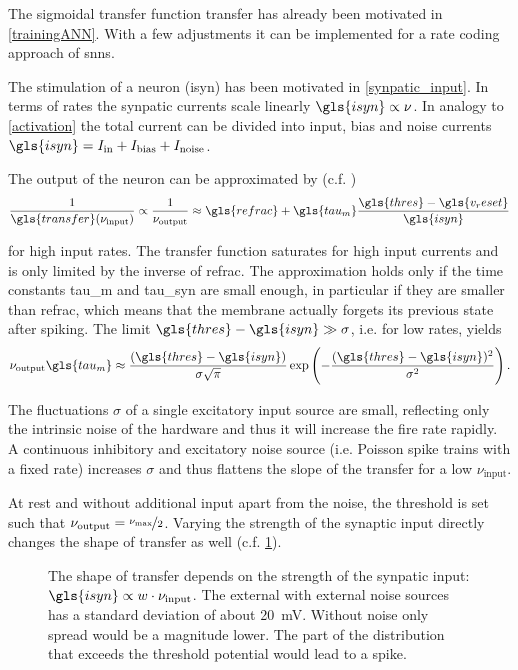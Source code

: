 The sigmoidal transfer function \gls{transfer} has already been motivated in \cref{trainingANN}. With a few adjustments it can be implemented for a rate coding approach of \glspl{snn}.

The stimulation of a neuron (\gls{isyn}) has been motivated in \cref{synpatic_input}. In terms of rates the synpatic currents scale linearly $\gls{isyn} \propto \nu$. In analogy to \cref{activation} the total current can be divided into input, bias and noise currents $\gls{isyn} = I_\text{in} + I_\text{bias} + I_\text{noise}$.

The output of the neuron can be approximated by (c.f. \cite{brunel2000dynamics})
\begin{equation}\label{fireratehigh}
\frac{1}{\gls{transfer}(\nu_\text{input})} \propto \frac{1}{\nu_\text{output}} \approx \gls{refrac} + \gls{tau_m} \frac{\gls{thres} - \gls{v_reset}}{\gls{isyn}}
\end{equation}

for high input rates. The transfer function saturates for high input currents and is only limited by the inverse of \gls{refrac}. The approximation holds only if the time constants \gls{tau_m} and \gls{tau_syn} are small enough, in particular if they are smaller than \gls{refrac}, which means that the membrane actually forgets its previous state after spiking. The limit $\gls{thres} - \gls{isyn} \gg \sigma$, i.e. for low rates, yields
\begin{equation}\label{fireratelow}
\nu_\text{output} \gls{tau_m} \approx \frac{(\gls{thres} - \gls{isyn})}{\sigma \sqrt{\pi}} \exp\left(-\frac{(\gls{thres} - \gls{isyn})^2}{\sigma^2}\right).
\end{equation}

The fluctuations $\sigma$ of a single excitatory input source are small, reflecting only the intrinsic noise of the hardware and thus it will increase the fire rate rapidly. A continuous inhibitory and excitatory noise source (i.e. Poisson spike trains with a fixed rate) increases $\sigma$ and thus flattens the slope of the \gls{transfer} for a low $\nu_\text{input}$. 

At rest and without additional input apart from the noise, the threshold is set such that $\nu_\text{output} = \nicefrac{\nu_\text{max}}{2}$. Varying the strength of the synaptic input directly changes the shape of \gls{transfer} as well (c.f. \cref{transferfunction}).

\begin{figure}
	\label{transferfunction}
	\begin{center}
		
	\end{center}
	\caption{The shape of \gls{transfer} depends on the strength of the synpatic input: $\gls{isyn} \propto w \cdot \nu_\text{input}$. The external  with external noise sources has a standard deviation of about \SI{20}{\milli\V}. Without noise only spread would be a magnitude lower. The part of the distribution that exceeds the threshold potential would lead to a spike.}
\end{figure}

